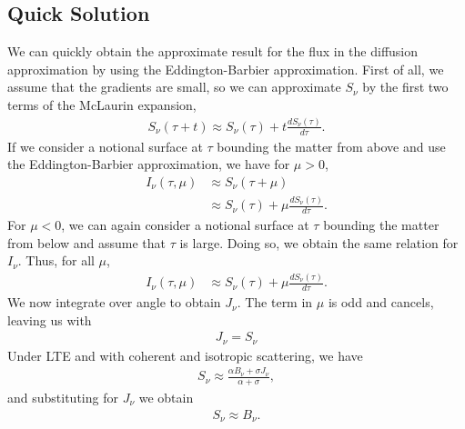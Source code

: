 

\newslide

\subsection{Quick Solution}

We can quickly obtain the approximate result for the flux in the diffusion approximation by using the Eddington-Barbier approximation.
First of all, we assume that the gradients are small, so we can approximate $S_\nu$ by the first two terms of the McLaurin expansion, 
\begin{align}
S_\nu(\tau+t) \approx S_\nu(\tau) + t \frac{dS_\nu(\tau)}{d\tau}.
\end{align}
If we consider a notional surface at $\tau$ bounding the matter from above and use the 
Eddington-Barbier approximation, we have for $\mu > 0$,
\begin{align}
I_\nu(\tau,\mu) 
&\approx S_\nu(\tau + \mu)\\
&\approx S_\nu(\tau) + \mu\frac{dS_\nu(\tau)}{d\tau}.
\end{align}
For $\mu < 0$, we can again consider a notional surface at $\tau$ bounding the matter from below and assume that $\tau$ is large. Doing so, we obtain the same relation for $I_\nu$. Thus, for all $\mu$,
\begin{align}
I_\nu(\tau,\mu) 
&\approx S_\nu(\tau) + \mu\frac{dS_\nu(\tau)}{d\tau}.
\end{align}
We now integrate over angle to obtain $J_\nu$. The term in $\mu$ is odd and cancels, leaving us with
\begin{align}
J_\nu = S_\nu
\end{align}
Under LTE and with coherent and isotropic scattering, we have
\begin{align}
S_\nu \approx \frac{\alpha B_\nu + \sigma J_\nu}{\alpha + \sigma},
\end{align}
and substituting for $J_\nu$ we obtain
\begin{align}
S_\nu \approx B_\nu.
\end{align}

